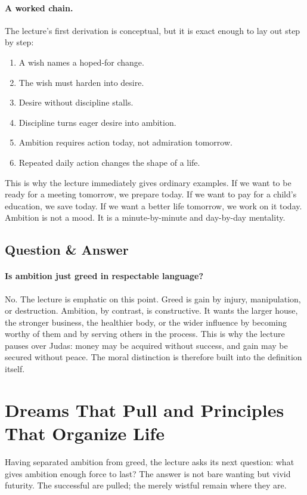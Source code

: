\paragraph{A worked chain.}
The lecture's first derivation is conceptual, but it is exact enough to lay out step by step:
\begin{enumerate}
\item A wish names a hoped-for change.
\item The wish must harden into desire.
\item Desire without discipline stalls.
\item Discipline turns eager desire into ambition.
\item Ambition requires action today, not admiration tomorrow.
\item Repeated daily action changes the shape of a life.
\end{enumerate}
This is why the lecture immediately gives ordinary examples. If we want to be ready for a meeting tomorrow, we prepare today. If we want to pay for a child's education, we save today. If we want a better life tomorrow, we work on it today. Ambition is not a mood. It is a minute-by-minute and day-by-day mentality.

\subsection{Question \& Answer}

\paragraph{Is ambition just greed in respectable language?}
No. The lecture is emphatic on this point. Greed is gain by injury, manipulation, or destruction. Ambition, by contrast, is constructive. It wants the larger house, the stronger business, the healthier body, or the wider influence by becoming worthy of them and by serving others in the process. This is why the lecture pauses over Judas: money may be acquired without success, and gain may be secured without peace. The moral distinction is therefore built into the definition itself.

\section{Dreams That Pull and Principles That Organize Life}

Having separated ambition from greed, the lecture asks its next question: what gives ambition enough force to last? The answer is not bare wanting but vivid futurity. The successful are pulled; the merely wistful remain where they are.

